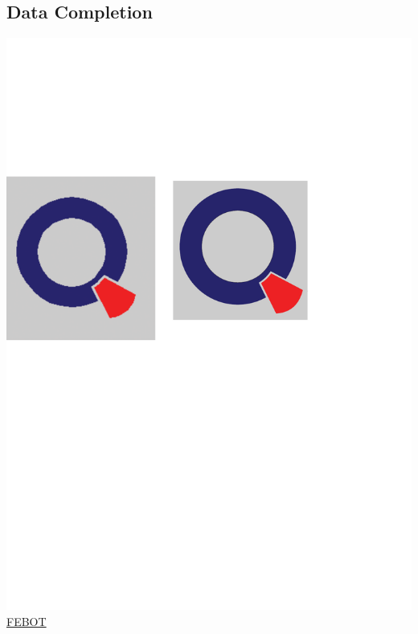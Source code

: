 \documentclass[12pt, a4paper, bibliography=totoc, english]{scrartcl}
\begin{document}
\subsection{Data Completion}
\includegraphics[scale=0.08]{qletlogo}
\textcolor{blue}{\href{https://github.com/JingyiLiu3136/MLFBM/blob/master/FEBOT/FEBOT.R}{FEBOT}}
\end{document}
